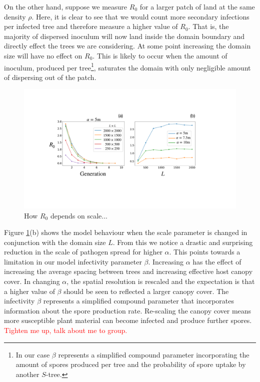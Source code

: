 On the other hand, suppose we measure $R_0$ for a larger patch of land at the same density $\rho$. Here, it is clear to see that we would count more secondary infections per infected tree and therefore measure a higher value of $R_0$. That is, the majority of dispersed inoculum will now land inside the domain boundary and directly effect the trees we are considering. At some point increasing the domain size will have no effect on $R_0$. This is likely to occur when the amount of inoculum, produced per tree\footnote{In our case $\beta$ represents a simplified compound parameter incorporating the amount of spores produced per tree and the probability of spore uptake by another $S$-tree.}, saturates the domain with only negligible amount of dispersing out of the patch.\\

\begin{figure}
    \centering
    \includegraphics[scale=0.3]{chapter5/figures/fig2.pdf}
    \caption{How $R_0$ depends on scale...}
    \label{fig:R0-spatial-scale}
\end{figure}

Figure \ref{fig:R0-spatial-scale}(b) shows the model behaviour when the scale parameter is %
changed in conjunction with the domain size $L$. From this we notice a drastic and surprising %
reduction in the scale of pathogen spread for higher $\alpha$. %
This points towards a limitation in our model infectivity parameter $\beta$. %
Increasing $\alpha$ has the effect of increasing the average spacing between trees and %
increasing effective host canopy cover. %
In changing $\alpha$, the spatial resolution is rescaled and the expectation is that a higher value of $\beta$ should be seen to reflected a larger canopy cover. %
The infectivity $\beta$ represents a simplified compound parameter that incorporates information about the spore production rate. %
Re-scaling the canopy cover means more susceptible plant material can become infected and produce further spores. 
\textcolor{red}{Tighten me up, talk about me to group.}\\

